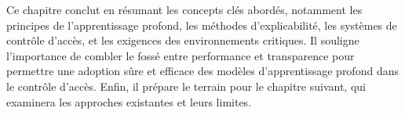 \label{sectionSyntheseChap1}
Ce chapitre conclut en résumant les concepts clés abordés, notamment les principes de l'apprentissage profond, les méthodes d'explicabilité, les systèmes de contrôle d'accès, et les exigences des environnements critiques. Il souligne l'importance de combler le fossé entre performance et transparence pour permettre une adoption sûre et efficace des modèles d'apprentissage profond dans le contrôle d'accès. Enfin, il prépare le terrain pour le chapitre suivant, qui examinera les approches existantes et leurs limites.

